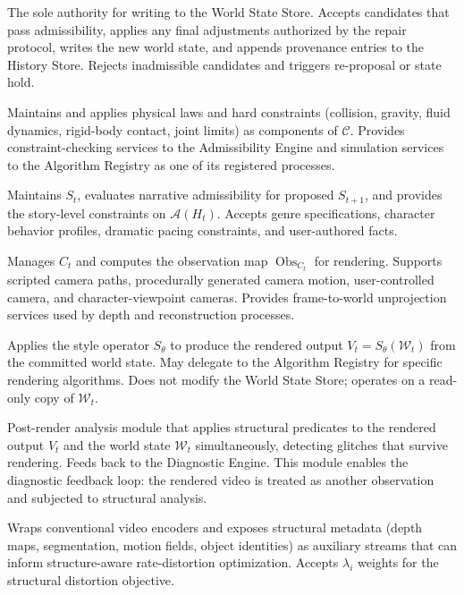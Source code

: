 \documentclass[12pt,a4paper]{article}
\theoremstyle{plain}
\theoremstyle{definition}
\theoremstyle{remark}
\DeclareMathOperator{\Obs}{Obs}
\begin{document}
\begin{description}[leftmargin=2em,itemsep=6pt]
\item[\textbf{Commitment Engine (CE).}] The sole authority for writing to the World State Store. Accepts candidates that pass admissibility, applies any final adjustments authorized by the repair protocol, writes the new world state, and appends provenance entries to the History Store. Rejects inadmissible candidates and triggers re-proposal or state hold.

\item[\textbf{Physics/Constraint Engine (PCE).}] Maintains and applies physical laws and hard constraints (collision, gravity, fluid dynamics, rigid-body contact, joint limits) as components of $\mathcal{C}$. Provides constraint-checking services to the Admissibility Engine and simulation services to the Algorithm Registry as one of its registered processes.

\item[\textbf{Narrative State Engine (NSE).}] Maintains $S_t$, evaluates narrative admissibility for proposed $S_{t+1}$, and provides the story-level constraints on $\mathcal{A}(H_t)$. Accepts genre specifications, character behavior profiles, dramatic pacing constraints, and user-authored facts.

\item[\textbf{Camera/Observation Engine (COE).}] Manages $C_t$ and computes the observation map $\Obs_{C_t}$ for rendering. Supports scripted camera paths, procedurally generated camera motion, user-controlled camera, and character-viewpoint cameras. Provides frame-to-world unprojection services used by depth and reconstruction processes.

\item[\textbf{Style/Realization Engine (SRE).}] Applies the style operator $S_\theta$ to produce the rendered output $V_t = S_\theta(\mathcal{W}_t)$ from the committed world state. May delegate to the Algorithm Registry for specific rendering algorithms. Does not modify the World State Store; operates on a read-only copy of $\mathcal{W}_t$.

\item[\textbf{Structural Analyzer (SA).}] Post-render analysis module that applies structural predicates to the rendered output $V_t$ and the world state $\mathcal{W}_t$ simultaneously, detecting glitches that survive rendering. Feeds back to the Diagnostic Engine. This module enables the diagnostic feedback loop: the rendered video is treated as another observation and subjected to structural analysis.

\item[\textbf{Encoder/Codec Interface (ECI).}] Wraps conventional video encoders and exposes structural metadata (depth maps, segmentation, motion fields, object identities) as auxiliary streams that can inform structure-aware rate-distortion optimization. Accepts $\lambda_i$ weights for the structural distortion objective.


\end{description}
\end{document}
